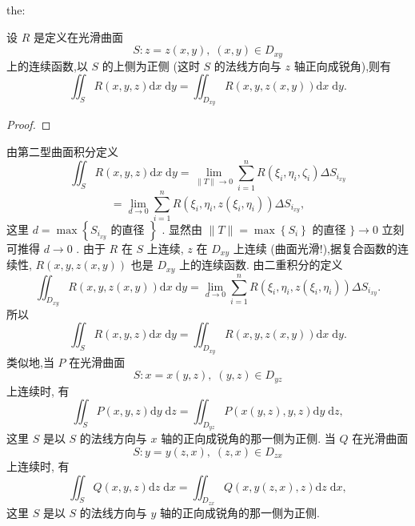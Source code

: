 \begin{theorem}{}{the:}

\end{theorem}
 设 \(R\) 是定义在光滑曲面
\[
S : z = z\left( {x,y}\right) ,\;\left( {x,y}\right)  \in  {D}_{xy}
\]
上的连续函数,以 \(S\) 的上侧为正侧 (这时 \(S\) 的法线方向与 \(z\) 轴正向成锐角),则有
\[
{\iint }_{S}R\left( {x,y,z}\right) \mathrm{d}x\mathrm{\;d}y = {\iint }_{{D}_{xy}}R\left( {x,y,z\left( {x,y}\right) }\right) \mathrm{d}x\mathrm{\;d}y. \tag{2}
\]
\begin{proof}

\end{proof}
由第二型曲面积分定义
\[
{\iint }_{S}R\left( {x,y,z}\right) \mathrm{d}x\mathrm{\;d}y = \mathop{\lim }\limits_{{\parallel T\parallel  \rightarrow  0}}\mathop{\sum }\limits_{{i = 1}}^{n}R\left( {{\xi }_{i},{\eta }_{i},{\zeta }_{i}}\right) \Delta {S}_{{i}_{xy}}
\]
\[
= \mathop{\lim }\limits_{{d \rightarrow  0}}\mathop{\sum }\limits_{{i = 1}}^{n}R\left( {{\xi }_{i},{\eta }_{i},z\left( {{\xi }_{i},{\eta }_{i}}\right) }\right) \Delta {S}_{{i}_{xy}},
\]
这里 \(d = \max \left\{  {{S}_{{i}_{xy}}\text{ 的直径 }}\right\}\) . 显然由 \(\parallel T\parallel  = \max \left\{  {S}_{i}\right\}\) 的直径 \(\}  \rightarrow  0\) 立刻可推得 \(d \rightarrow  0\) . 由于 \(R\) 在 \(S\) 上连续, \(z\) 在 \({D}_{xy}\) 上连续 (曲面光滑!),据复合函数的连续性, \(R\left( {x,y,z\left( {x,y}\right) }\right)\) 也是 \({D}_{xy}\) 上的连续函数. 由二重积分的定义
\[
{\iint }_{{D}_{xy}}R\left( {x,y,z\left( {x,y}\right) }\right) \mathrm{d}x\mathrm{\;d}y = \mathop{\lim }\limits_{{d \rightarrow  0}}\mathop{\sum }\limits_{{i = 1}}^{n}R\left( {{\xi }_{i},{\eta }_{i},z\left( {{\xi }_{i},{\eta }_{i}}\right) }\right) \Delta {S}_{{i}_{xy}}.
\]
所以
\[
{\iint }_{S}R\left( {x,y,z}\right) \mathrm{d}x\mathrm{\;d}y = {\iint }_{{D}_{xy}}R\left( {x,y,z\left( {x,y}\right) }\right) \mathrm{d}x\mathrm{\;d}y.
\]
类似地,当 \(P\) 在光滑曲面
\[
S : x = x\left( {y,z}\right) ,\;\left( {y,z}\right)  \in  {D}_{yz}
\]
上连续时, 有
\[
{\iint }_{S}P\left( {x,y,z}\right) \mathrm{d}y\mathrm{\;d}z = {\iint }_{{D}_{yz}}P\left( {x\left( {y,z}\right) ,y,z}\right) \mathrm{d}y\mathrm{\;d}z, \tag{3}
\]
这里 \(S\) 是以 \(S\) 的法线方向与 \(x\) 轴的正向成锐角的那一侧为正侧. 当 \(Q\) 在光滑曲面
\[
S : y = y\left( {z,x}\right) ,\;\left( {z,x}\right)  \in  {D}_{zx}
\]
上连续时, 有
\[
{\iint }_{S}Q\left( {x,y,z}\right) \mathrm{d}z\mathrm{\;d}x = {\iint }_{{D}_{zx}}Q\left( {x,y\left( {z,x}\right) ,z}\right) \mathrm{d}z\mathrm{\;d}x, \tag{4}
\]
这里 \(S\) 是以 \(S\) 的法线方向与 \(y\) 轴的正向成锐角的那一侧为正侧.


